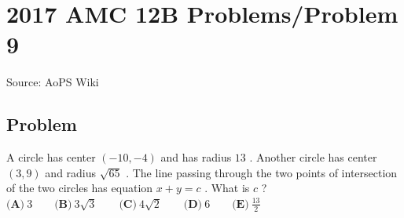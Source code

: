 \documentclass[12pt]{article}
\begin{document}
\section*{{2017 AMC 12B Problems/Problem 9}}
Source: AoPS Wiki

\subsection*{Problem}
A circle has center $(-10, -4)$ and has radius $13$ . Another circle has center $(3, 9)$ and radius $\sqrt{65}$ . The line passing through the two points of intersection of the two circles has equation $x+y=c$ . What is $c$ ? $\textbf{(A)}\ 3\qquad\textbf{(B)}\ 3\sqrt{3}\qquad\textbf{(C)}\ 4\sqrt{2}\qquad\textbf{(D)}\ 6\qquad\textbf{(E)}\ \frac{13}{2}$
\end{document}
